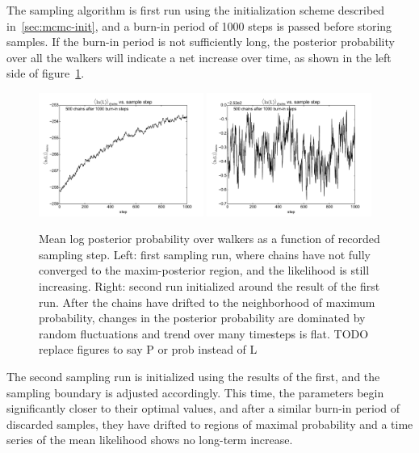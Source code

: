 \documentclass[12pt]{article}
\begin{document}
The sampling algorithm is first run using the initialization scheme described in~\ref{sec:mcmc-init}, and a burn-in period of 1000 steps is passed before storing samples. If the burn-in period is not sufficiently long, the posterior probability over all the walkers will indicate a net increase over time, as shown in the left side of figure~\ref{fig:timeseries}.
\begin{figure}[htb]
  \begin{center}
    \includegraphics[width=0.48\textwidth]{AuAu200MB/1/lnprob-vs-step}
    \includegraphics[width=0.48\textwidth]{AuAu200MB/2/lnprob-vs-step}
  \end{center}
  \caption{Mean log posterior probability over walkers as a function of recorded sampling step. Left: first sampling run, where chains have not fully converged to the maxim-posterior region, and the likelihood is still increasing. Right: second run initialized around the result of the first run. After the chains have drifted to the neighborhood of maximum probability, changes in the posterior probability are dominated by random fluctuations and trend over many timesteps is flat. TODO replace figures to say P or prob instead of L}
  \label{fig:timeseries}
\end{figure}
The second sampling run is initialized using the results of the first, and the sampling boundary is adjusted accordingly. This time, the parameters begin significantly closer to their optimal values, and after a similar burn-in period of discarded samples, they have drifted to regions of maximal probability and a time series of the mean likelihood shows no long-term increase.
\end{document}
